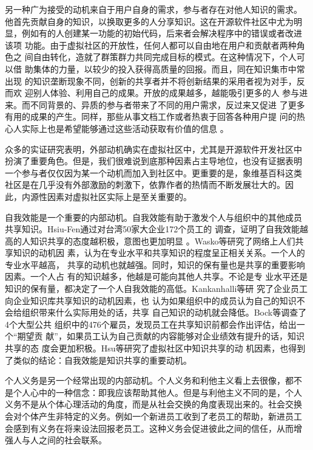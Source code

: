 \documentclass[12pt,a4paper]{ctexart}
\begin{document}
另一种广为接受的动机来自于用户自身的需求，参与者存在对他人知识的需求。
他首先贡献自身的知识，以换取更多的人分享知识。这在开源软件社区中尤为明
显，例如有的人创建某一功能的初始代码，后来者会解决程序中的错误或者改进
该项
功能。由于虚拟社区的开放性，任何人都可以自由地在用户和贡献者两种角色之
间自由转化，造就了群策群力共同完成目标的模式。在这种情况下，个人可以借
助集体的力量，以较少的投入获得高质量的回报。而且，同在知识集市中常出现
的知识垄断现象不同，创新的共享者并不将创新结果的采用者视为对手，反而欢
迎别人体验、利用自己的成果。开放的成果越多，越能吸引更多的人
参与进来。而不同背景的、异质的参与者带来了不同的用户需求，反过来又促进
了更多有用的成果的产生。同样，那些从事文档工作或者热衷于回答各种用户提
问的热心人实际上也是希望能够通过这些活动获取有价值的信息
\cite{lakhani2003fos}。



众多的实证研究表明，外部动机确实在虚拟社区中，尤其是开源软件开发社区中
扮演了重要角色。但是，我们很难说到底那种因素占主导地位，也没有证据表明
一个参与者仅仅因为某一个动机而加入到社区中。更重要的是，象维基百科这类
社区是在几乎没有外部激励的刺激下，依靠作者的热情而不断发展壮大的。因
此，内源性因素对虚拟社区实际上是至关重要的。

自我效能是一个重要的内部动机。自我效能有助于激发个人与组织中的其他成员
共享知识。Hsiu-Fen通过对台湾50家大企业172个员工的
调查，证明了自我效能越高的人知识共享的态度越积极，意图也更加明显
\cite{Hsiu-FenLin04012007}。Wasko等研究了网络上人们共享知识的动机因
素，认为在专业水平和共享知识的程度呈正相关关系。一个人的专业水平越高，
共享的动机也就越强。同时，知识的保有量也是共享的重要影响因素。一个人占
有的知识越多，他越是可能向其他人共享\cite{1631335820050301}。不论是专
业水平还是知识的保有量，都决定了一个人自我效能的高低。Kankanhalli等研
究了企业员工向企业知识库共享知识的动机因素，也
认为如果组织中的成员认为自己的知识不会给组织带来什么实际用处的话，共享
自己知识的动机就会降低\cite{1631337020050301}。Bock等调查了4个大型公共
组织中的476个雇员，发现员工在共享知识前都会作出评估，给出一个“期望贡
献”，如果员工认为自己贡献的内容能够对企业绩效有提升的话，知识共享的态
度会更加积极\cite{631757820020401}。Hsu等研究了虚拟社区中知识共享的动
机因素，也得到了类似的结论：自我效能是知识共享的重要动机\cite{Hsu2007}。

个人义务是另一个经常出现的内部动机。个人义务和利他主义看上去很像，都不
是个人心中的一种信念：即我应该帮助其他人。但是与利他主义不同的是，个人
义务不是从个体心理活动的角度，而是从社会交换的角度表现出来的。社会交换
会对个体产生非特定的义务。例如一个新进员工收到了老员工的帮助，新进员工
会感到有义务在将来设法回报老员工。这种义务会促进彼此之间的信任，从而增
强人与人之间的社会联系\cite{gouldner1960nrp}。
\end{document}
